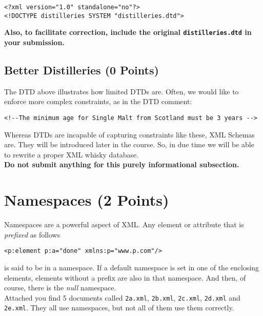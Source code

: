 \documentclass[a4paper, 12pt]{scrartcl}
\begin{document}
\lstset{language=XML}
\begin{lstlisting}
<?xml version="1.0" standalone="no"?>
<!DOCTYPE distilleries SYSTEM "distilleries.dtd">
\end{lstlisting}

\noindent \textbf{Also, to facilitate correction, include the original \texttt{distilleries.dtd} in your submission.}

\subsection{Better Distilleries (0 Points)}

The DTD above illustrates how limited DTDs are. Often, we would like to enforce more complex constraints, as in the DTD comment:

\lstset{language=XML}
\begin{lstlisting}
<!--The minimum age for Single Malt from Scotland must be 3 years -->
\end{lstlisting}

\noindent Whereas DTDs are incapable of capturing constraints like these, XML Schemas are. They will be introduced later in the course. So, in due time we will be able to rewrite a proper XML whisky database. \\

\noindent \textbf{Do not submit anything for this purely informational subsection.} 

\section{Namespaces (2 Points)}

Namespaces are a powerful aspect of XML. Any element or attribute that is \textit{prefixed} as follows

\lstset{language=XML}
\begin{lstlisting}
<p:element p:a="done" xmlns:p="www.p.com"/>
\end{lstlisting}

\noindent is said to be in a namespace. If a default namespace is set in one of the enclosing elements, elements without a prefix are also in that namespace. And then, of course, there is the \textit{null} namespace.\\

\noindent Attached you find 5 documents called \texttt{2a.xml}, \texttt{2b.xml}, \texttt{2c.xml}, \texttt{2d.xml} and \texttt{2e.xml}. They all use namespaces, but not all of them use them correctly. \\
\end{document}
